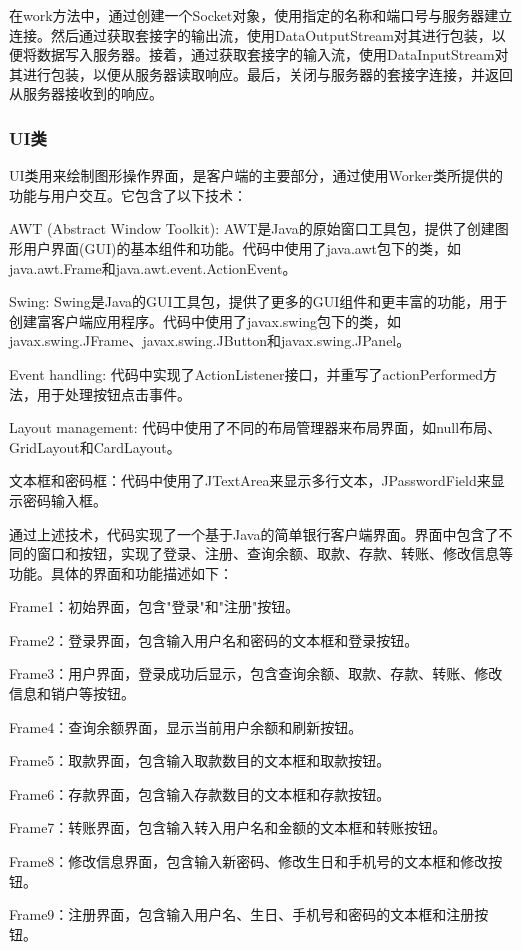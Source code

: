 在work方法中，通过创建一个Socket对象，使用指定的名称和端口号与服务器建立连接。然后通过获取套接字的输出流，使用DataOutputStream对其进行包装，以便将数据写入服务器。接着，通过获取套接字的输入流，使用DataInputStream对其进行包装，以便从服务器读取响应。最后，关闭与服务器的套接字连接，并返回从服务器接收到的响应。

\subsubsection{UI类}
UI类用来绘制图形操作界面，是客户端的主要部分，通过使用Worker类所提供的功能与用户交互。它包含了以下技术：

AWT (Abstract Window Toolkit): AWT是Java的原始窗口工具包，提供了创建图形用户界面(GUI)的基本组件和功能。代码中使用了java.awt包下的类，如java.awt.Frame和java.awt.event.ActionEvent。

Swing: Swing是Java的GUI工具包，提供了更多的GUI组件和更丰富的功能，用于创建富客户端应用程序。代码中使用了javax.swing包下的类，如javax.swing.JFrame、javax.swing.JButton和javax.swing.JPanel。

Event handling: 代码中实现了ActionListener接口，并重写了actionPerformed方法，用于处理按钮点击事件。

Layout management: 代码中使用了不同的布局管理器来布局界面，如null布局、GridLayout和CardLayout。

文本框和密码框：代码中使用了JTextArea来显示多行文本，JPasswordField来显示密码输入框。

通过上述技术，代码实现了一个基于Java的简单银行客户端界面。界面中包含了不同的窗口和按钮，实现了登录、注册、查询余额、取款、存款、转账、修改信息等功能。具体的界面和功能描述如下：

Frame1：初始界面，包含"登录"和"注册"按钮。

Frame2：登录界面，包含输入用户名和密码的文本框和登录按钮。

Frame3：用户界面，登录成功后显示，包含查询余额、取款、存款、转账、修改信息和销户等按钮。

Frame4：查询余额界面，显示当前用户余额和刷新按钮。

Frame5：取款界面，包含输入取款数目的文本框和取款按钮。

Frame6：存款界面，包含输入存款数目的文本框和存款按钮。

Frame7：转账界面，包含输入转入用户名和金额的文本框和转账按钮。

Frame8：修改信息界面，包含输入新密码、修改生日和手机号的文本框和修改按钮。

Frame9：注册界面，包含输入用户名、生日、手机号和密码的文本框和注册按钮。

